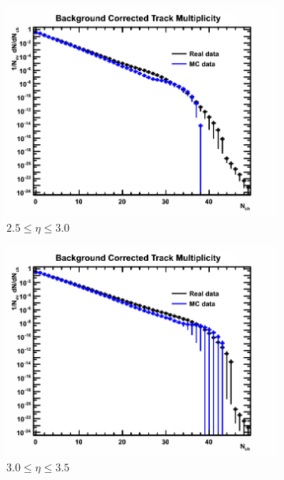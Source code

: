 \begin{figure}[H]
	\begin{subfigure}{0.32\textwidth}
		\includegraphics[width=\textwidth]{Chapters/multiplicity/charged_particle_event_multiplicity/images/background_correction_comparison/2_5-3_0.png}
		\caption{$2.5 \le \eta \le 3.0$}
	\end{subfigure}
	\begin{subfigure}{0.32\textwidth}
		\includegraphics[width=\textwidth]{Chapters/multiplicity/charged_particle_event_multiplicity/images/background_correction_comparison/3_0-3_5.png}
		\caption{$3.0 \le \eta \le 3.5$}
	\end{subfigure}
	\begin{subfigure}{0.32\textwidth}

\end{subfigure}
\end{figure}
